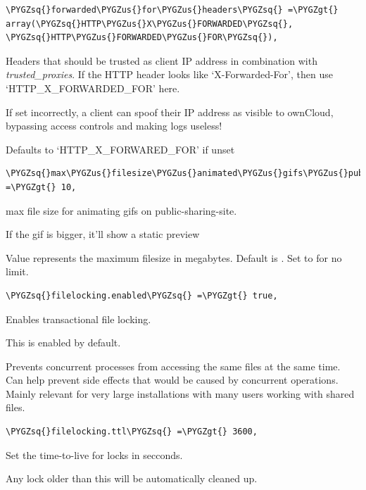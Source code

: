\documentclass[letterpaper,10pt,english]{sphinxmanual}
\def\PYGZus{\char`\_}
\def\PYGZgt{\char`\>}
\def\PYGZsq{\char`\'}
\renewcommand\PYGZsq{\textquotesingle}
\begin{document}
\begin{Verbatim}[commandchars=\\\{\}]
\PYGZsq{}forwarded\PYGZus{}for\PYGZus{}headers\PYGZsq{} =\PYGZgt{} array(\PYGZsq{}HTTP\PYGZus{}X\PYGZus{}FORWARDED\PYGZsq{}, \PYGZsq{}HTTP\PYGZus{}FORWARDED\PYGZus{}FOR\PYGZsq{}),
\end{Verbatim}

Headers that should be trusted as client IP address in combination with
\emph{trusted\_proxies}. If the HTTP header looks like `X-Forwarded-For', then use
`HTTP\_X\_FORWARDED\_FOR' here.

If set incorrectly, a client can spoof their IP address as visible to
ownCloud, bypassing access controls and making logs useless!

Defaults to `HTTP\_X\_FORWARED\_FOR' if unset

\begin{Verbatim}[commandchars=\\\{\}]
\PYGZsq{}max\PYGZus{}filesize\PYGZus{}animated\PYGZus{}gifs\PYGZus{}public\PYGZus{}sharing\PYGZsq{} =\PYGZgt{} 10,
\end{Verbatim}

max file size for animating gifs on public-sharing-site.

If the gif is bigger, it'll show a static preview

Value represents the maximum filesize in megabytes. Default is . Set to
 for no limit.

\begin{Verbatim}[commandchars=\\\{\}]
\PYGZsq{}filelocking.enabled\PYGZsq{} =\PYGZgt{} true,
\end{Verbatim}

Enables transactional file locking.

This is enabled by default.

Prevents concurrent processes from accessing the same files
at the same time. Can help prevent side effects that would
be caused by concurrent operations. Mainly relevant for
very large installations with many users working with
shared files.

\begin{Verbatim}[commandchars=\\\{\}]
\PYGZsq{}filelocking.ttl\PYGZsq{} =\PYGZgt{} 3600,
\end{Verbatim}

Set the time-to-live for locks in secconds.

Any lock older than this will be automatically cleaned up.
\end{document}
